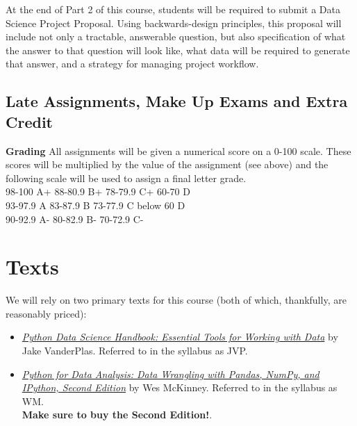 \documentclass[12pt]{article}
\begin{document}
At the end of Part 2 of this course, students will be required to submit a Data Science Project Proposal. Using backwards-design principles, this proposal will include not only a tractable, answerable question, but also specification of what the answer to that question will look like, what data will be required to generate that answer, and a strategy for managing project workflow.

\subsection{Late Assignments, Make Up Exams and Extra Credit}


\textbf{Grading}
All assignments will be given a numerical score on a 0-100 scale.  These scores will be multiplied by the value of the assignment (see above) and the following scale will be used to assign a final letter grade.  \\

\hspace*{.2in} 98-100 A+ 	\hspace*{.6in}  88-80.9 B+  	\hspace*{.57in} 78-79.9 C+  		\hspace*{.44in} 60-70 D  	\\
\hspace*{.2in} 93-97.9 A	\hspace*{.68in} 83-87.9 B  	\hspace*{.695in} 73-77.9 C		\hspace*{.57in} below 60 D\\
\hspace*{.2in} 90-92.9 A- 	\hspace*{.63in} 	80-82.9 B- 	\hspace*{.64in} 70-72.9 C-	\\

\section{Texts}

We will rely on two primary texts for this course (both of which, thankfully, are reasonably priced):

\begin{itemize}
	\item \href{https://www.amazon.com/Python-Data-Science-Handbook-Essential-dp-1491912057/dp/1491912057}{\emph{Python Data Science Handbook: Essential Tools for Working with Data}} by Jake VanderPlas. Referred to in the syllabus as JVP.
	\item \href{https://www.amazon.com/gp/product/1491957662}{\emph{Python for Data Analysis: Data Wrangling with Pandas, NumPy, and IPython, Second Edition}} by Wes McKinney. Referred to in the syllabus as WM. \\
	\textbf{Make sure to buy the Second Edition!}.
\end{itemize}
\end{document}
